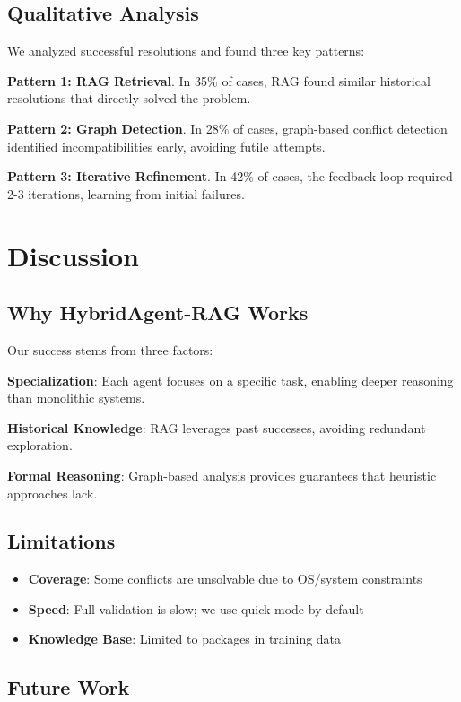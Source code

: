 \documentclass[sigconf]{acmart}
\begin{document}
\subsection{Qualitative Analysis}

We analyzed successful resolutions and found three key patterns:

\textbf{Pattern 1: RAG Retrieval}. In 35\% of cases, RAG found similar historical resolutions that directly solved the problem.

\textbf{Pattern 2: Graph Detection}. In 28\% of cases, graph-based conflict detection identified incompatibilities early, avoiding futile attempts.

\textbf{Pattern 3: Iterative Refinement}. In 42\% of cases, the feedback loop required 2-3 iterations, learning from initial failures.

\section{Discussion}

\subsection{Why HybridAgent-RAG Works}

Our success stems from three factors:

\textbf{Specialization}: Each agent focuses on a specific task, enabling deeper reasoning than monolithic systems.

\textbf{Historical Knowledge}: RAG leverages past successes, avoiding redundant exploration.

\textbf{Formal Reasoning}: Graph-based analysis provides guarantees that heuristic approaches lack.

\subsection{Limitations}

\begin{itemize}
\item \textbf{Coverage}: Some conflicts are unsolvable due to OS/system constraints
\item \textbf{Speed}: Full validation is slow; we use quick mode by default
\item \textbf{Knowledge Base}: Limited to packages in training data
\end{itemize}

\subsection{Future Work}
\end{document}

